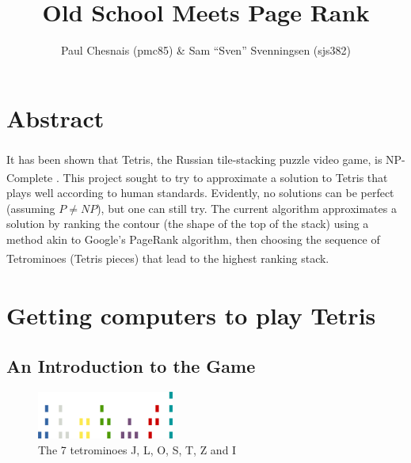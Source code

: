 \documentclass[ fontsize=11pt]{article}
\title{Old School \tetris{} Meets Page Rank}
\author{Paul Chesnais (pmc85) \& Sam ``Sven'' Svenningsen (sjs382)}
\date{}
\def\tetris{Tetris\textsuperscript{\textregistered}}
\begin{document}
\maketitle
\thispagestyle{empty}
\section{Abstract}
\label{sec:abstract}

\par It has been shown that \tetris{}, the Russian tile-stacking puzzle video game, is NP-Complete \cite{tetrishard}. This project sought to try to approximate a solution to \tetris{} that plays well according to human standards. Evidently, no solutions can be perfect (assuming $P \neq NP$), but one can still try. The current algorithm approximates a solution by ranking the contour (the shape of the top of the stack) using a method akin to Google's PageRank algorithm, then choosing the sequence of Tetrominoes (\tetris{} pieces) that lead to the highest ranking stack.

\section{Getting computers to play \tetris{}}
\label{sec:getting_computers_to_play_tetris}

\subsection{An Introduction to the Game}
\label{sub:an_introduction_to_the_game}

\begin{figure}[h!]
  \centering
  \includegraphics[width=0.4\textwidth, height=0.1\textwidth]{figures/pieces}
  \caption{The 7 tetrominoes J, L, O, S, T, Z and I }
  \label{fig:the_7_tetrominoes}
\end{figure}
\end{document}

